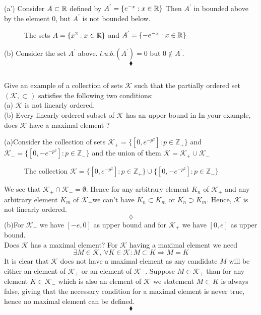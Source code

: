 (a') Consider $A\subset \mathbb{R}$ defined by $A^{'}=\{e^{-x}:x\in \mathbb{R}\}$
Then $A^{'}$ in bounded above by the element $0$, but $A^{'}$ is not bounded below. 
\begin{figure}[H]%
    \centering
    
\caption{The sets  $A=\{x^2:x\in \mathbb{R}\}$ and $A^{'}=\{-e^{-x}:x\in \mathbb{R}\}$}
\label{fig:fig_p8b}
\end{figure}
(b) Consider the set $A^{'}$ above. $l.u.b.(A^{'}) = 0$ but $0\not\in A^{'}$.
$$\blacklozenge$$

\subsection{}
\begin{tcolorbox}
Give an example of a collection of sets $\mathscr{K}$ such that the partially ordered set $(\mathscr{K}, \subset)$ satisfies the following two conditions: \\
(a) $\mathscr{K}$ is not linearly ordered.\\
(b) Every linearly ordered subset of $\mathscr{K}$ has an upper bound in In your example, does $\mathscr{K}$ have a maximal element ? 
\end{tcolorbox}
$$ $$
(a)Consider the collection of sets $\mathscr{K}_{+} = \{[0, e^{-p^2}]:p\in \mathbb{Z}_{+}\}$ and $\mathscr{K}_{-} = \{[0, -e^{-p^2}]:p\in \mathbb{Z}_{-}\}$ and the union of them $\mathscr{K} = \mathscr{K}_{+}\cup \mathscr{K}_{-}$
\begin{figure}[H]%
    \centering
    
\caption{The collection   $\mathscr{K} =  \{[0, e^{-p^2}]:p\in \mathbb{Z}_{+}\}\cup  \{[0, -e^{-p^2}]:p\in \mathbb{Z}_{-}\}$}
\label{fig:fig_p8b}
\end{figure}
We see that $\mathscr{K}_{+}\cap \mathscr{K}_{-}=\emptyset$. Hence for any arbitrary element $K_n$ of $\mathscr{K}_{+}$ and any arbitrary element $K_m$ of $\mathscr{K}_{-}$we can't have $K_n\subset K_m$ or $K_n\supset K_m$. Hence, $\mathscr{K}$ is not linearly ordered.
$$\lozenge$$
(b)For $\mathscr{K}_{-}$ we have $[-e,0]$ as upper bound and for  $\mathscr{K}_{+}$ we have $[0,e]$ as upper bound. \\
Does $\mathscr{K}$ has a maximal element? For $\mathscr{K}$  having a maximal element we need 
$$\exists M\in \mathscr{K},\,\forall K\in \mathscr{K}: M\subset K\Rightarrow M=K$$ 
It is clear that $\mathscr{K}$ does not have a maximal element as  any candidate $M$ will be either an element of $\mathscr{K}_{+}$ or an element of $\mathscr{K}_{-}$. Suppose $M\in \mathscr{K}_{+}$ than for any element $K\in \mathscr{K}_{-}$ which is also an element of $\mathscr{K}_{}$ we statement $M\subset K$ is always false, giving that the necessary condition for a maximal element is never true, hence no maximal element can be defined.
$$\blacklozenge$$

